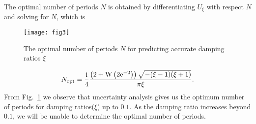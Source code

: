  The optimal number of periods $N$ is obtained by differentiating $U_\xi$ with respect $N$ and solving for $N$, which is
\begin{figure}[h]


\centering

\texttt{[image: fig3]}
\caption{The optimal number of periods $N$ for predicting accurate damping ratios $\xi$ }
\label{f2}
\end{figure}

\begin{equation}
N_{\rm{opt}}=\frac{1}{4} \frac{\left(2+\mathrm{W}\left(2 \mathrm{e}^{-2}\right)\right) \sqrt{-(\xi-1)(\xi+1)}}{\pi \xi}.
\end{equation}
From Fig.~\ref{f2} we observe that uncertainty analysis gives us the optimum number of periods for damping ratios($\xi$) up to $0.1$. 
As the damping ratio increases beyond $0.1 $, we will be unable to determine the optimal number of periods.